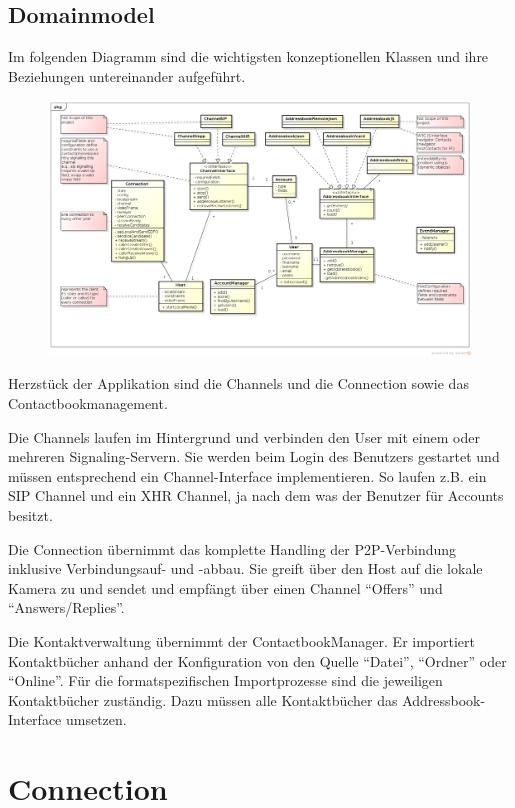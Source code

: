 \begin{landscape}
\section{Domainmodel}
	Im folgenden Diagramm sind die wichtigsten konzeptionellen Klassen und ihre Beziehungen untereinander aufgeführt.
	\begin{figure}[H]
		\centering
		\includegraphics[width=1.2\textwidth]{../architekturanalayse/img/domain.png}
	\end{figure}
	Herzstück der Applikation sind die Channels und die Connection sowie das Contactbookmanagement.
	
	Die Channels laufen im Hintergrund und verbinden den User mit einem oder mehreren Signaling-Servern. Sie werden beim Login des Benutzers gestartet und müssen entsprechend ein Channel-Interface implementieren. So laufen z.B. ein SIP Channel und ein XHR Channel, ja nach dem was der Benutzer für Accounts besitzt.
	
	Die Connection übernimmt das komplette Handling der P2P-Verbindung inklusive Verbindungsauf- und -abbau. Sie greift über den Host auf die lokale Kamera zu und sendet und empfängt über einen Channel "`Offers"' und "`Answers/Replies"'.
	
	Die Kontaktverwaltung übernimmt der ContactbookManager. Er importiert Kontaktbücher anhand der Konfiguration von den Quelle "`Datei"', "`Ordner"' oder "`Online"'. Für die formatspezifischen Importprozesse sind die jeweiligen Kontaktbücher zuständig. Dazu müssen alle Kontaktbücher das Addressbook-Interface umsetzen.
\end{landscape}

\section{Connection}


